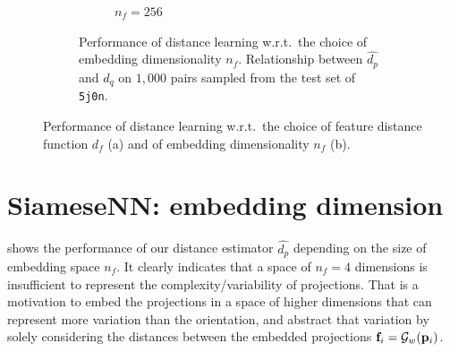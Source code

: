 \begin{figure}[ht]
\begin{subfigure}[b]{0.48\linewidth}
\begin{subfigure}[t]{0.48\linewidth}
            \caption*{$n_f=256$} %
        \end{subfigure}
        \caption{%
            Performance of distance learning w.r.t.\ the choice of embedding dimensionality $n_f$.
            Relationship between $\widehat{d_p}$ and $d_q$ on $1,000$ pairs sampled from the test set of \texttt{5j0n}.
        }\label{fig:4d-vs-256d-de}
    \end{subfigure}
        \caption{%
            Performance of distance learning w.r.t.\ the choice of feature distance function $d_f$ (a) and of embedding dimensionality $n_f$ (b).
        }
\end{figure}

\section{SiameseNN: embedding dimension}\label{apx:siamese:embedding-dimension}


 shows the performance of our distance estimator $\widehat{d_p}$ depending on the size of embedding space $n_f$.
It clearly indicates that a space of $n_f=4$ dimensions is insufficient to represent the complexity/variability of projections.
That is a motivation to embed the projections in a space of higher dimensions that can represent more variation than the orientation, and abstract that variation by solely considering the distances between the embedded projections $\mathbf{f}_i = \mathcal{G}_w(\mathbf{p}_i)$.

